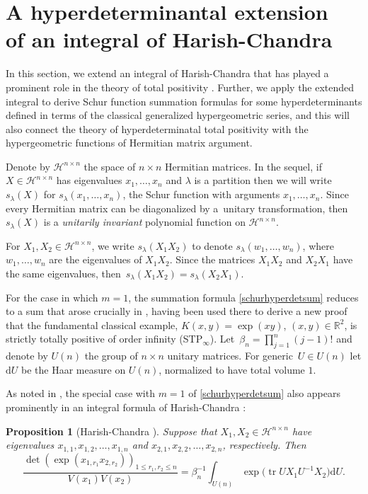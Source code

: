 \documentclass[10pt,a4paper]{amsart}
\numberwithin{equation}{section}
\newtheorem{Proposition}[Theorem]{Proposition}
 { \theoremstyle{definition}
\newtheorem{Definition}[Theorem]{Definition}
\newtheorem{Note}[Theorem]{Note}
\newtheorem{Example}[Theorem]{Example}
\newtheorem{Remark}[Theorem]{Remark} }
\def\R{{\mathbb R}}
\def\dd{ \mathrm{d}}
\def\tr{\operatorname{tr} }
\def\mcalHn{\mathcal{H}^{n \times n}}
\begin{document}
\section[A hyperdeterminantal extension of an integral of Harish-Chandra]{A hyperdeterminantal extension\\ of an integral of Harish-Chandra}
\label{sec_extension_HC}

In this section, we extend an integral of Harish-Chandra \cite{harishchandra} that has played a prominent role in the theory of total positivity \cite{grossrichards89,grossrichards95}. Further, we apply the extended integral to derive Schur function summation formulas for some hyperdeterminants defined in terms of the classical generalized hypergeometric series, and this will also connect the theory of hyperdeterminatal total positivity with the hypergeometric functions of Hermitian matrix argument.

Denote by $\mcalHn$ the space of $n \times n$ Hermitian matrices. In the sequel, if $X \in \mcalHn$ has eigenvalues $x_1,\dots,x_n$ and $\lambda$ is a partition then we will write $s_\lambda(X)$ for $s_\lambda(x_1,\dots,x_n)$, the Schur function with arguments $x_1,\dots,x_n$. Since every Hermitian matrix can be diagonalized by a~unitary transformation, then $s_\lambda(X)$ is a {\it unitarily invariant} polynomial function on $\mcalHn$.

For $X_1, X_2 \in \mcalHn$, we write $s_\lambda(X_1X_2)$ to denote $s_\lambda(w_1,\dots,w_n)$, where $w_1,\dots,w_n$ are the eigenvalues of $X_1X_2$. Since the matrices $X_1X_2$ and $X_2X_1$ have the same eigenvalues, then~${s_\lambda(X_1X_2) = s_\lambda(X_2X_1)}$.

For the case in which $m=1$, the summation formula \eqref{schurhyperdetsum} reduces to a sum that arose crucially in \cite{grossrichards89}, having been used there to derive a new proof that the fundamental classical example, $K(x,y) = \exp(xy)$, $(x,y) \in \R^2$, is strictly totally positive of order infinity (STP$_\infty$). Let~${
\beta_n = \prod_{j=1}^n (j-1)!}
$
and denote by $U(n)$ the group of $n \times n$ unitary matrices. For generic~${U \in U(n)}$ let $\dd U$ be the Haar measure on $U(n)$, normalized to have total volume $1$.

As noted in \cite{grossrichards89}, the special case with $m=1$ of \eqref{schurhyperdetsum} also appears prominently in an integral formula of Harish-Chandra \cite{harishchandra}:

\begin{Proposition}[Harish-Chandra \cite{harishchandra}]
\label{prop_hc_integral}
Suppose that $X_1, X_2 \in \mcalHn$ have eigenvalues $x_{1,1},\allowbreak x_{1,2}, \dots,x_{1,n}$ and $x_{2,1},x_{2,2},\dots,x_{2,n}$, respectively. Then
\begin{equation}
\frac{\det(\exp(x_{1,r_1} x_{2,r_2}))_{1 \le r_1,r_2\le n}}{V(x_1) V(x_2)} = \beta_n^{-1} \int_{U(n)} \exp\bigl(\tr UX_1U^{-1}X_2\bigr) \dd U.\label{hcintegraldet}
\end{equation}
\end{Proposition}
\end{document}
